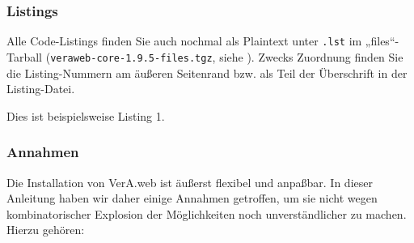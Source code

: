 \documentclass{tarentanleitung}
\newcommand{\vwiaverssw}{1.9.5}
\begin{document}
\subsubsection{Listings}\label{subsubsec:aboutmanual-lst}

\begin{minipage}{\linewidth}
Alle Code-Listings finden Sie auch nochmal als Plaintext unter
\texttt{\jobname.lst} im „files“-Tarball
(\texttt{veraweb-core-\vwiaverssw{}-files.tgz}, siehe
).
Zwecks Zuordnung finden Sie die Listing-Nummern am äußeren
Seitenrand bzw. als Teil der Überschrift in der Listing-Datei.

\begin{lstdumpx}
Dies ist beispielsweise Listing 1.
\end{lstdumpx}
\end{minipage}

\subsubsection{Annahmen}\label{subsubsec:aboutmanual-assume}

Die Installation von VerA.web ist äußerst flexibel und anpaßbar.
In dieser Anleitung haben wir daher einige Annahmen getroffen, um
sie nicht wegen kombinatorischer Explosion der Möglichkeiten noch
unverständlicher zu machen. Hierzu gehören:\keinumbruch
\end{document}
